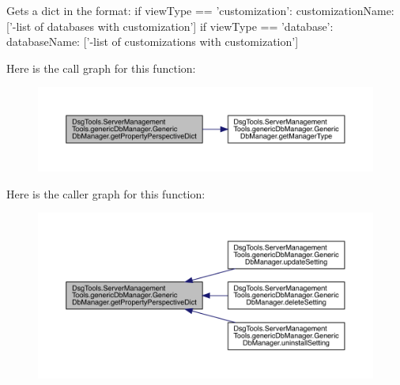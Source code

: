 \begin{DoxyVerb}Gets a dict in the format:
if viewType == 'customization': {customizationName: ['-list of databases with customization']}
if viewType == 'database': {databaseName: ['-list of customizations with customization']}
\end{DoxyVerb}
 Here is the call graph for this function\+:
\nopagebreak
\begin{figure}[H]
\begin{center}
\leavevmode
\includegraphics[width=350pt]{class_dsg_tools_1_1_server_management_tools_1_1generic_db_manager_1_1_generic_db_manager_ac8baf4bdec5e9e8ce318b00b59369d13_cgraph}
\end{center}
\end{figure}
Here is the caller graph for this function\+:
\nopagebreak
\begin{figure}[H]
\begin{center}
\leavevmode
\includegraphics[width=350pt]{class_dsg_tools_1_1_server_management_tools_1_1generic_db_manager_1_1_generic_db_manager_ac8baf4bdec5e9e8ce318b00b59369d13_icgraph}
\end{center}
\end{figure}
\mbox{\label{class_dsg_tools_1_1_server_management_tools_1_1generic_db_manager_1_1_generic_db_manager_a31b4f877b09455ef4b360fb141fdb72e}} 
